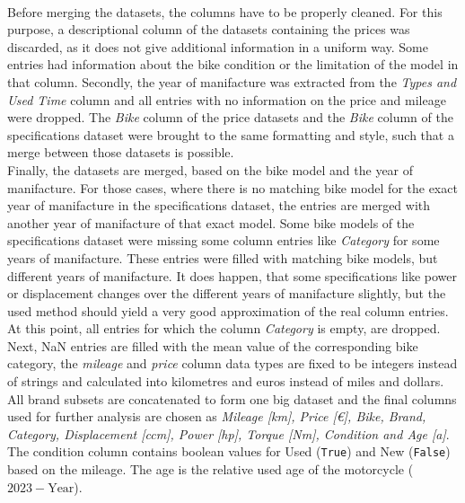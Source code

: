\\ Before merging the datasets, the columns have to be properly cleaned. For this purpose, a descriptional column of the datasets
containing the prices was discarded, as it does not give additional information in a uniform way. Some entries had information about
the bike condition or the limitation of the model in that column. Secondly, the year of manifacture was extracted from the \textit{Types and Used Time}
column and all entries with no information on the price and mileage were dropped. The \textit{Bike} column of the price datasets
and the \textit{Bike} column of the specifications dataset were brought to the same formatting and style, such that a merge between those
datasets is possible.\\
Finally, the datasets are merged, based on the bike model and the year of manifacture. For those cases, where there is no matching
bike model for the exact year of manifacture in the specifications dataset, the entries are merged with another year of manifacture 
of that exact model. Some bike models of the specifications dataset were missing some column entries like \textit{Category} for some years
of manifacture. These entries were filled with matching bike models, but different years of manifacture. It does happen, that some specifications
like power or displacement changes over the different years of manifacture slightly, but the used method should yield a very
good approximation of the real column entries. At this point, all entries for which the column \textit{Category} is empty, are dropped.\\
Next, NaN entries are filled with the mean value of the corresponding bike category, the \textit{mileage} and  \textit{price} column data types are fixed to 
be integers instead of strings and calculated into kilometres and euros instead of miles and dollars.\\
All brand subsets are concatenated
to form one big dataset and the final columns used for further analysis are chosen as \textit{Mileage [km], Price [€], Bike, 
Brand, Category, Displacement [ccm], Power [hp], Torque [Nm], Condition and Age [a]}.
The condition column contains boolean values for Used (\texttt{True}) and New (\texttt{False}) based on the mileage. The age is the 
relative used age of the motorcycle ($2023 - \mathrm{Year}$).

